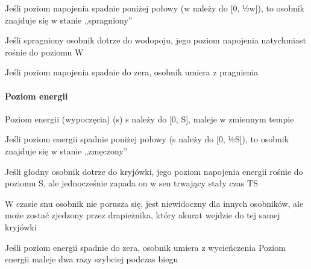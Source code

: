 \begin{DoxyItemize}
\item Jeśli poziom napojenia spadnie poniżej połowy (w należy do \mbox{[}0, ½w\mbox{]}), to osobnik znajduje się w stanie „spragniony”
\end{DoxyItemize}


\begin{DoxyItemize}
\item Jeśli spragniony osobnik dotrze do wodopoju, jego poziom napojenia natychmiast rośnie do poziomu W
\end{DoxyItemize}


\begin{DoxyItemize}
\item Jeśli poziom napojenia spadnie do zera, osobnik umiera z pragnienia
\end{DoxyItemize}

\paragraph*{Poziom energii}

Poziom energii (wypoczęcia) (s) s należy do \mbox{[}0, S\mbox{]}, maleje w zmiennym tempie


\begin{DoxyItemize}
\item Jeśli poziom energii spadnie poniżej połowy (s należy do \mbox{[}0, ½\-S\mbox{]}), to osobnik znajduje się w stanie „zmęczony”
\end{DoxyItemize}


\begin{DoxyItemize}
\item Jeśli głodny osobnik dotrze do kryjówki, jego poziom napojenia energii rośnie do poziomu S, ale jednocześnie zapada on w sen trwający stały czas T\-S
\end{DoxyItemize}


\begin{DoxyItemize}
\item W czasie snu osobnik nie porusza się, jest niewidoczny dla innych osobników, ale może zostać zjedzony przez drapieżnika, który akurat wejdzie do tej samej kryjówki
\end{DoxyItemize}


\begin{DoxyItemize}
\item Jeśli poziom energii spadnie do zera, osobnik umiera z wycieńczenia Poziom energii maleje dwa razy szybciej podczas biegu
\end{DoxyItemize}

